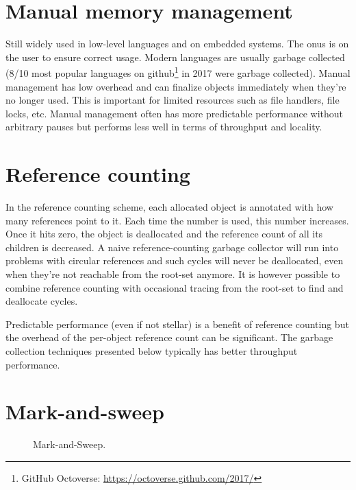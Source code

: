 \documentclass[a4paper,oneside]{memoir}
\begin{document}

\section{Manual memory management}
Still widely used in low-level languages and on embedded systems.
The onus is on the user to ensure correct usage.
Modern languages are usually garbage collected (8/10 most popular languages on
github\footnote{GitHub Octoverse: \url{https://octoverse.github.com/2017/}}
in 2017 were garbage collected).
Manual management has low overhead and can finalize objects immediately when
they're no longer used. This is important for limited resources such as file
handlers, file locks, etc.
Manual management often has more predictable performance without arbitrary pauses
but performs less well in terms of throughput and locality.

\section{Reference counting}

In the reference counting scheme, each allocated object is annotated with how
many references point to it. Each time the number is used, this number
increases. Once it hits zero, the object is deallocated and the reference
count of all its children is decreased. A naive reference-counting garbage
collector will run into problems with circular references and such cycles
will never be deallocated, even when they're not reachable from the root-set
anymore. It is however possible to combine reference counting with occasional
tracing from the root-set to find and deallocate cycles.

Predictable performance (even if not stellar) is a benefit of reference counting
but the overhead of the per-object reference count can be significant. The
garbage collection techniques presented below typically has better throughput
performance.

\section{Mark-and-sweep}
\begin{figure}[b]
  \centering
  
  \caption{Mark-and-Sweep.}
  \label{mark_and_sweep}
\end{figure}
\end{document}
